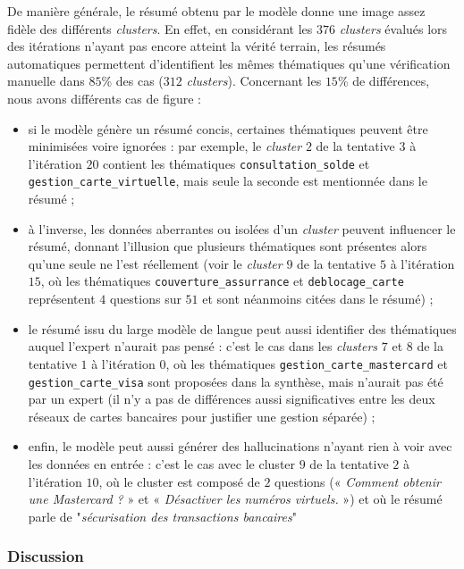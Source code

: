 			De manière générale, le résumé obtenu par le modèle donne une image assez fidèle des différents \textit{clusters}.
			En effet, en considérant les $376$ \textit{clusters} évalués lors des itérations n'ayant pas encore atteint la vérité terrain, les résumés automatiques permettent d'identifient les mêmes thématiques qu'une vérification manuelle dans $85$\% des cas ($312$ \textit{clusters}).
			Concernant les $15$\% de différences, nous avons différents cas de figure :
			\begin{itemize}
				\item si le modèle génère un résumé concis, certaines thématiques peuvent être minimisées voire ignorées : par exemple, le \textit{cluster} $2$ de la tentative $3$ à l'itération $20$ contient les thématiques \texttt{consultation\_solde} et \texttt{gestion\_carte\_virtuelle}, mais seule la seconde est mentionnée dans le résumé ;
				\item à l'inverse, les données aberrantes ou isolées d'un \textit{cluster} peuvent influencer le résumé, donnant l'illusion que plusieurs thématiques sont présentes alors qu'une seule ne l'est réellement (voir le \textit{cluster} $9$ de la tentative $5$ à l'itération $15$, où les thématiques \texttt{couverture\_assurrance} et \texttt{deblocage\_carte} représentent $4$ questions sur $51$ et sont néanmoins citées dans le résumé) ;
				\item le résumé issu du large modèle de langue peut aussi identifier des thématiques auquel l'expert n'aurait pas pensé : c'est le cas dans les \textit{clusters} $7$ et $8$ de la tentative $1$ à l'itération $0$, où les thématiques \texttt{gestion\_carte\_mastercard} et \texttt{gestion\_carte\_visa} sont proposées dans la synthèse, mais n'aurait pas été par un expert (il n'y a pas de différences aussi significatives entre les deux réseaux de cartes bancaires pour justifier une gestion séparée) ;
				\item enfin, le modèle peut aussi générer des hallucinations n'ayant rien à voir avec les données en entrée : c'est le cas avec le cluster $9$ de la tentative $2$ à l'itération $10$, où le cluster est composé de $2$ questions (« \textit{Comment obtenir une Mastercard ?} » et « \textit{Désactiver les numéros virtuels.} ») et où le résumé parle de "\textit{sécurisation des transactions bancaires}"
			\end{itemize}

		\subsubsection{Discussion}
			
